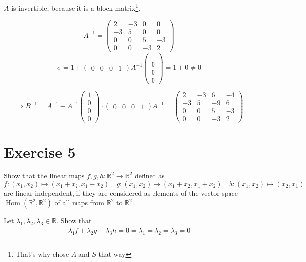 \documentclass[a4paper]{article}
\theoremstyle{definition}
\DeclareMathOperator\Hom{Hom}
\begin{document}
$A$ is invertible, because it is a block matrix\footnote{That's why chose $A$ and $S$ that way}.

\[
  A^{-1} = \begin{pmatrix}
    2 & -3 & 0 & 0 \\
    -3 & 5 & 0 & 0 \\
    0 & 0 & 5 & -3 \\
    0 & 0 & -3 & 2
  \end{pmatrix}
\] \[
  \sigma = 1 + \begin{pmatrix} 0 & 0 & 0 & 1 \end{pmatrix} A^{-1} \begin{pmatrix} 1 \\ 0 \\ 0 \\ 0 \end{pmatrix} = 1 + 0 \neq 0
\]

\[ \Rightarrow B^{-1} = A^{-1} - A^{-1} \begin{pmatrix} 1 \\ 0 \\ 0 \\ 0 \end{pmatrix} \cdot \begin{pmatrix} 0 & 0 & 0 & 1 \end{pmatrix} A^{-1}
  = \begin{pmatrix}
    2 & -3 & 6 & -4  \\
    -3 & 5 & -9 & 6 \\
    0 & 0 & 5 & -3 \\
    0 & 0 & -3 & 2
  \end{pmatrix}
\]

\section{Exercise 5}
\begin{ex}
  Show that the linear maps $f,g,h: \mathbb R^2 \to \mathbb R^2$ defined as
  \[
    f: (x_1, x_2) \mapsto (x_1 + x_2, x_1 - x_2) \quad
    g: (x_1, x_2) \mapsto (x_1 + x_2, x_1 + x_2) \quad
    h: (x_1, x_2) \mapsto (x_2, x_1)
  \]
  are linear independent, if they are considered as elements of the vector space
  $\Hom(\mathbb R^2, \mathbb R^2)$ of all maps from $\mathbb R^2$ to $\mathbb R^2$.
\end{ex}

Let $\lambda_1, \lambda_2, \lambda_3 \in \mathbb R$.
Show that
\[ \lambda_1 f + \lambda_2 g + \lambda_3 h = 0 \stackrel!{=} \lambda_1 = \lambda_2 = \lambda_3 = 0 \]
\end{document}
